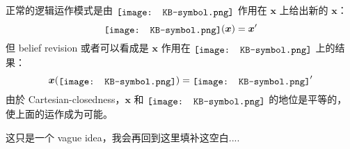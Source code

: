 \documentclass[orivec]{llncs}
\newcommand{\vect}[1]{\boldsymbol{#1}}
\newcommand*\KB{\raisebox{-.2\height}{\texttt{[image: KB-symbol.png]}}}
\begin{document}
\begin{tcolorbox}
正常的逻辑运作模式是由 $\KB$ 作用在 $\vect{x}$ 上给出新的 $\vect{x}$：
\begin{equation}
\KB ( \vect{x} ) = \vect{x}'
\end{equation}
但 belief revision 或者可以看成是 $\vect{x}$ 作用在 $\KB$ 上的结果：
\begin{equation}
\vect{x} ( \KB ) = \KB'
\end{equation}
由於 Cartesian-closedness，$\vect{x}$ 和 $\KB$ 的地位是平等的，使上面的运作成为可能。 

这只是一个 vague idea，我会再回到这里填补这空白....

\end{tcolorbox}

\begin{comment}
\subsection{由一些命题推导出另一些命题}

命题也有内部结构（即命题可以由概念原子组合而成），但我们先从最简单情况谈起，即\textbf{命题逻辑}。

最简单的经典命题逻辑，是 Boolean propositional logic，它的\textbf{代数形式}是我们熟悉的 Boolean algebra，二者几乎没有分别（纯粹逻辑符号和代数符号的对应）。 

在 Boolean algebra 可以定义一种 ideal $I$：
\begin{itemize}
\item If $a, b \in I$ then $a \wedge b \in I$
\item If $a \in I$ and $a \le b$ then $b \in I$
\end{itemize}
其中 $a \le b$ 表示 $a \Rightarrow b$（a 蕴涵 b）。

由上面可以看出，这个 ideal 其实是由某些元素(命题)生成的 \textbf{逻辑后果}(logical consequence)； 换句话说，给定一个命题集 $\Gamma$，问 $\Gamma \stackrel{?}{\vdash} a$（从 $\Gamma$ 可以推导出 $a$ 吗？） 就等於问 $a$ 是不是 $\Gamma$ 生成的 ideal membership 问题。 也可以说，代数 ideal $\equiv$ 逻辑 consequence。 （严格来说，consequence 对应的是 filter 的概念，而 filter 是 ideal 的 dual，因为 0 和 1 对应的倒错，但这不是重点。）

\textbf{逻辑后果}可以记作 $\vdash$ 或 Cn，Tarski 定义了 $\vdash$ （很明显）的特性：
\begin{itemize}
\item (reflexivity): \quad $A \vdash A$ for every formula $A$
\item (monotonicity): \quad $A \vdash Q$ implies $A, B \vdash Q$
\item (`cut'): \quad \quad $A \vdash B$ and $A, B \vdash Q$ implies $A \vdash Q$
\end{itemize}


\end{comment}
\end{document}
